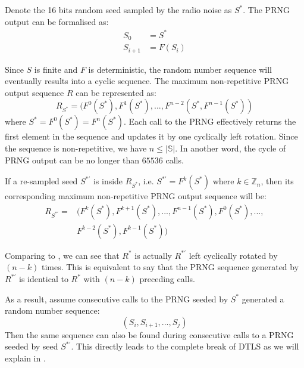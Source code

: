 Denote the 16 bits random seed sampled by the radio noise as $S^*$. The PRNG output can be formalised as:
\begin{equation}
	\begin{aligned}
	S_{0} &= S^* \\
	S_{i+1} &= F(S_{i})
	\end{aligned}
\end{equation}

Since ${S}$ is finite and $F$ is deterministic, the random number sequence will eventually results into a cyclic sequence. The maximum non-repetitive PRNG output sequence $R$ can be represented as:
\begin{equation} \label{R*}
R_{S^*}= (F^0(S^{*}), F^{1}(S^{*}), ..., F^{n-2}(S^{*}, F^{n-1}(S^{*}))
\end{equation}
where $S^{*} = F^{0}(S^{*}) = F^{n}(S^{*})$. Each call to the PRNG effectively returns the first element in the sequence and updates it by one cyclically left rotation. Since the sequence is non-repetitive, we have $n \leq |\mathbb{S}|$. In another word, the cycle of PRNG output can be no longer than $65536$ calls.

If a re-sampled seed $S^{*'}$ is inside $R_{S^*}$, i.e. $S^{*'} = F^{k}(S^*)$ where $k \in \mathbb{Z}_n$, then its corresponding maximum non-repetitive PRNG output sequence will be:
\begin{equation}\label{R*'}
	\begin{aligned}
	R_{S^{*'}} = &( F^{k}(S^*), F^{k+1}(S^{*}), ..., F^{n-1}(S^*), F^{0}(S^*), ...,\\
	&F^{k-2}(S^{*}), F^{k-1}(S^{*}))
	\end{aligned}
\end{equation}

Comparing  to , we can see that $R^*$ is actually $R^{*'}$ left cyclically rotated by $(n-k)$ times. This is equivalent to say that the PRNG sequence generated by $R^{*'}$ is identical to $R^*$ with $(n-k)$ preceding calls.

 As a result, assume consecutive calls to the PRNG seeded by $S^*$ generated a random number sequence:
\begin{equation*}
(S_i, S_{i+1}, ..., S_{j})
\end{equation*}
Then the same sequence can also be found during consecutive calls to a PRNG seeded by seed $S^{*'}$. This directly leads to the complete break of DTLS as we will explain in .

